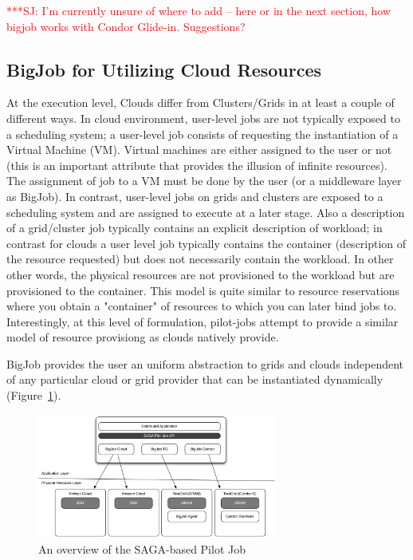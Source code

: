 \documentclass[conference,final]{IEEEtran}
\newcommand{\jhanote}[1]{ {\textcolor{red} { ***SJ: #1 }}}
\newcommand{\jhanote}[1]{}
\begin{document}
\jhanote{I'm currently unsure of where to add -- here or in the next
  section, how bigjob works with Condor Glide-in. Suggestions?}

\subsection{BigJob for Utilizing Cloud Resources}


At the execution level, Clouds differ from Clusters/Grids in at least
a couple of different ways. In cloud environment, user-level jobs are
not typically exposed to a scheduling system; a user-level job
consists of requesting the instantiation of a Virtual Machine (VM).
Virtual machines are either assigned to the user or not (this is an
important attribute that provides the illusion of infinite resources).
The assignment of job to a VM must be done by the user (or a
middleware layer as BigJob).  In contrast, user-level jobs on grids
and clusters are exposed to a scheduling system and are assigned to
execute at a later stage.  Also a description of a grid/cluster job
typically contains an explicit description of workload; in contrast
for clouds a user level job typically contains the container
(description of the resource requested) but does not necessarily
contain the workload. In other other words, the physical resources are
not provisioned to the workload but are provisioned to the container.
This model is quite similar to resource reservations where you obtain
a "container" of resources to which you can later bind jobs
to. Interestingly, at this level of formulation, pilot-jobs attempt to
provide a similar model of resource provisiong as clouds natively
provide.

BigJob provides the user an uniform abstraction to grids and clouds
independent of any particular cloud or grid provider that can be
instantiated dynamically
(Figure~\ref{fig:figures_distributed_pilot_job}).

\begin{figure}[htbp]
    \centering
        \includegraphics[width=0.7\textwidth]{figures/distributed_pilot_job.pdf}
    \caption{An overview of the SAGA-based Pilot Job}
    \label{fig:figures_distributed_pilot_job}
\end{figure}
\end{document}

